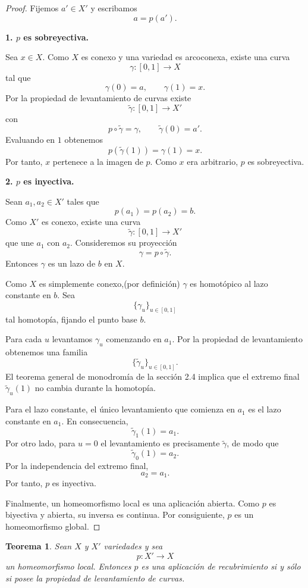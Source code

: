 \documentclass[11pt,a4paper]{article}
\theoremstyle{definition}
\theoremstyle{plain}
\newtheorem{teorema}{Teorema}[section]
\theoremstyle{remark}
\newcommand{\I}{[0,1]}
\begin{document}
\begin{proof}
Fijemos $a'\in X'$ y escribamos
\[
a=p(a').
\]

\textbf{1. $p$ es sobreyectiva.}

Sea $x\in X$. Como $X$ es conexo y una variedad es arcoconexa,
existe una curva
\[
\gamma:\I\longrightarrow X
\]
tal que
\[
\gamma(0)=a,
\qquad
\gamma(1)=x.
\]
Por la propiedad de levantamiento de curvas existe
\[
\widetilde\gamma:\I\longrightarrow X'
\]
con
\[
p\circ\widetilde\gamma=\gamma,
\qquad
\widetilde\gamma(0)=a'.
\]
Evaluando en $1$ obtenemos
\[
p(\widetilde\gamma(1))
=
\gamma(1)
=
x.
\]
Por tanto, $x$ pertenece a la imagen de $p$. Como $x$ era arbitrario,
$p$ es sobreyectiva.

\medskip

\textbf{2. $p$ es inyectiva.}

Sean $a_1,a_2\in X'$ tales que
\[
p(a_1)=p(a_2)=b.
\]
Como $X'$ es conexo, existe una curva
\[
\widetilde\gamma:\I\longrightarrow X'
\]
que une $a_1$ con $a_2$. Consideremos su proyección
\[
\gamma=p\circ\widetilde\gamma.
\]
Entonces $\gamma$ es un lazo de $b$ en $X$.

Como $X$ es simplemente conexo,(por definición) $\gamma$ es homotópico al lazo
constante en $b$. Sea
\[
\{\gamma_u\}_{u\in\I}
\]
tal homotopía, fijando el punto base $b$.

Para cada $u$ levantamos $\gamma_u$ comenzando en $a_1$. Por la
propiedad de levantamiento obtenemos una familia
\[
\{\widetilde\gamma_u\}_{u\in\I}.
\]
El teorema general de monodromía de la sección 2.4 implica que el
extremo final $\widetilde\gamma_u(1)$ no cambia durante la homotopía.

Para el lazo constante, el único levantamiento que comienza en $a_1$
es el lazo constante en $a_1$. En consecuencia,
\[
\widetilde\gamma_1(1)=a_1.
\]
Por otro lado, para $u=0$ el levantamiento es precisamente
$\widetilde\gamma$, de modo que
\[
\widetilde\gamma_0(1)=a_2.
\]
Por la independencia del extremo final,
\[
a_2=a_1.
\]
Por tanto, $p$ es inyectiva.

Finalmente, un homeomorfismo local es una aplicación abierta. Como
$p$ es biyectiva y abierta, su inversa es continua. Por consiguiente,
$p$ es un homeomorfismo global.
\end{proof}

\begin{teorema}
Sean $X$ y $X'$ variedades y sea
\[
p:X'\longrightarrow X
\]
un homeomorfismo local. Entonces $p$ es una aplicación de recubrimiento
si y sólo si posee la propiedad de levantamiento de curvas.
\end{teorema}
\end{document}
